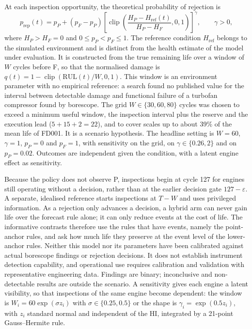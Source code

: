 \documentclass[preprint,12pt]{elsarticle}
\begin{document}
At each inspection opportunity, the theoretical probability of rejection is
\begin{equation}
  p_{\mathrm{rep}}(t)=p_P+(p_F-p_P)
  \left[\operatorname{clip}\!\left(
  \frac{H_P-H_{\mathrm{ref}}(t)}{H_P-H_F},0,1\right)\right]^\gamma,
  \qquad \gamma>0,
\end{equation}
where $H_P>H_F=0$ and $0\leq p_P<p_F\leq1$. The reference condition $H_{\mathrm{ref}}$ belongs to the simulated environment and is distinct from the health estimate of the model under evaluation. It is constructed from the true remaining life over a window of $W$ cycles before F, so that the normalised damage is $q(t)=1-\operatorname{clip}(\mathrm{RUL}(t)/W,0,1)$. This window is an environment parameter with no empirical reference: a search found no published value for the interval between detectable damage and functional failure of a turbofan compressor found by borescope. The grid $W\in\{30,60,80\}$ cycles was chosen to exceed a minimum useful window, the inspection interval plus the reserve and the execution lead ($5+15+2=22$), and to cover scales up to about 39\% of the mean life of FD001. It is a scenario hypothesis. The headline setting is $W=60$, $\gamma=1$, $p_P=0$ and $p_F=1$, with sensitivity on the grid, on $\gamma\in\{0.26,2\}$ and on $p_P=0.02$. Outcomes are independent given the condition, with a latent engine effect as sensitivity.

Because the policy does not observe P, inspections begin at cycle 127 for engines still operating without a decision, rather than at the earlier decision gate $127-\varepsilon$. A separate, idealised reference starts inspections at $T-W$ and uses privileged information. As a rejection only advances a decision, a hybrid arm can never gain life over the forecast rule alone; it can only reduce events at the cost of life. The informative contrasts therefore use the rules that have events, namely the point-anchor rules, and ask how much life they preserve at the event level of the lower-anchor rules. Neither this model nor its parameters have been calibrated against actual borescope findings or rejection decisions. It does not establish instrument detection capability, and operational use requires calibration and validation with representative engineering data. Findings are binary; inconclusive and non-detectable results are outside the scenario. A sensitivity gives each engine a latent visibility, so that inspections of the same engine become dependent: the window is $W_i=60\exp(\sigma z_i)$ with $\sigma\in\{0.25,0.5\}$ or the shape is $\gamma_i=\exp(0.5z_i)$, with $z_i$ standard normal and independent of the HI, integrated by a 21-point Gauss--Hermite rule.
\end{document}
